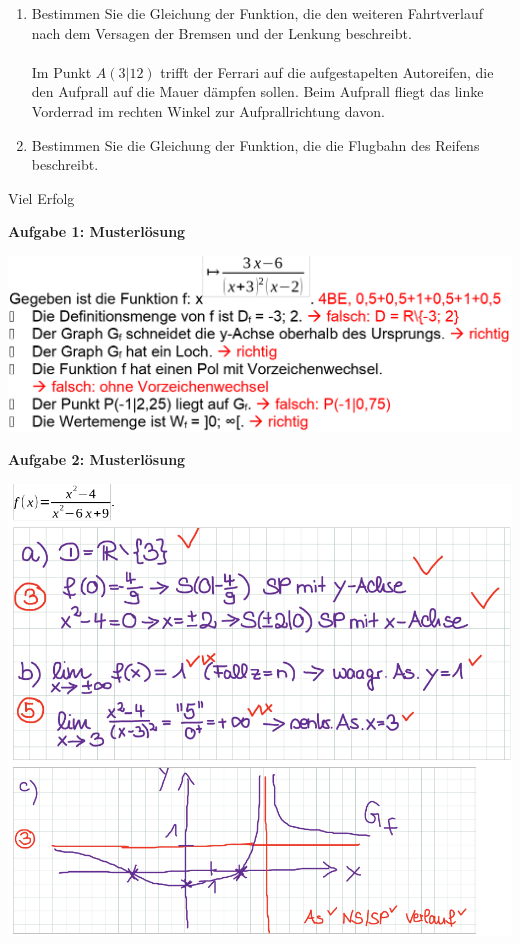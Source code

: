 \documentclass[a4paper,12pt]{article}
\newcommand{\Aufgabe}[1]{
  {
  \vspace*{0.5cm}
  \textsf{\textbf{Aufgabe #1}}
  \vspace*{0.2cm}
  
  }
}
\begin{document}
\begin{enumerate}[label={\alph*)}]
  \item Bestimmen Sie die Gleichung der Funktion, die den weiteren Fahrtverlauf nach dem Versagen der Bremsen und der Lenkung beschreibt.\\
    \\
    Im Punkt $A(3|12)$ trifft der Ferrari auf die aufgestapelten Autoreifen, die den Aufprall auf die Mauer dämpfen sollen. Beim Aufprall fliegt das linke Vorderrad im rechten Winkel zur Aufprallrichtung davon.
  \item Bestimmen Sie die Gleichung der Funktion, die die Flugbahn des Reifens beschreibt.
\end{enumerate}



\centerline{Viel Erfolg}







\newpage
\Aufgabe{1: Musterlösung}
\includegraphics[width=\linewidth]{Q11_1KlausurJanuar2022_ml1.png}

\Aufgabe{2: Musterlösung}
\includegraphics[width=\linewidth]{Q11_1KlausurJanuar2022_ml2.png}
\end{document}
